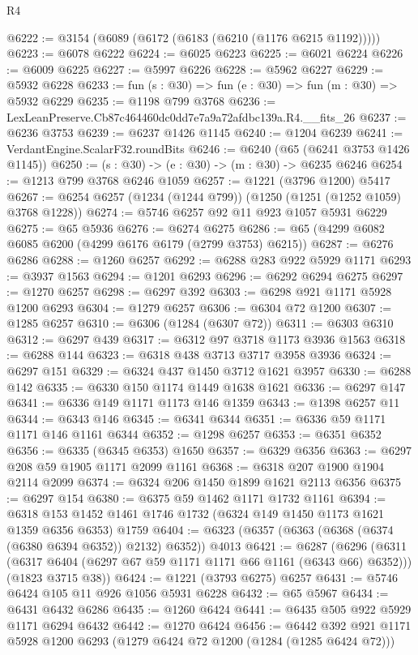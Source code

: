 \begin{lexlean}{R4}
\begin{coremodule}
@6222 := @3154 (@6089 (@6172 (@6183 (@6210 (@1176 @6215 @1192)))))
@6223 := @6078 @6222
@6224 := @6025 @6223
@6225 := @6021 @6224
@6226 := @6009 @6225
@6227 := @5997 @6226
@6228 := @5962 @6227
@6229 := @5932 @6228
@6233 := fun (s : @30) => fun (e : @30) => fun (m : @30) => @5932 @6229
@6235 := @1198 @799 @3768
@6236 := LexLeanPreserve.Cb87c464460dc0dd7e7a9a72afdbc139a.R4.__fits_26
@6237 := @6236 @3753
@6239 := @6237 @1426 @1145
@6240 := @1204 @6239
@6241 := VerdantEngine.ScalarF32.roundBits
@6246 := @6240 (@65 (@6241 @3753 @1426 @1145))
@6250 := (s : @30) -> (e : @30) -> (m : @30) -> @6235 @6246
@6254 := @1213 @799 @3768 @6246 @1059
@6257 := @1221 (@3796 @1200) @5417
@6267 := @6254 @6257 (@1234 (@1244 @799)) (@1250 (@1251 (@1252 @1059) @3768 @1228))
@6274 := @5746 @6257 @92 @11 @923 @1057 @5931 @6229
@6275 := @65 @5936
@6276 := @6274 @6275
@6286 := @65 (@4299 @6082 @6085 @6200 (@4299 @6176 @6179 (@2799 @3753) @6215))
@6287 := @6276 @6286
@6288 := @1260 @6257
@6292 := @6288 @283 @922 @5929 @1171
@6293 := @3937 @1563
@6294 := @1201 @6293
@6296 := @6292 @6294 @6275
@6297 := @1270 @6257
@6298 := @6297 @392
@6303 := @6298 @921 @1171 @5928 @1200 @6293
@6304 := @1279 @6257
@6306 := @6304 @72 @1200
@6307 := @1285 @6257
@6310 := @6306 (@1284 (@6307 @72))
@6311 := @6303 @6310
@6312 := @6297 @439
@6317 := @6312 @97 @3718 @1173 @3936 @1563
@6318 := @6288 @144
@6323 := @6318 @438 @3713 @3717 @3958 @3936
@6324 := @6297 @151
@6329 := @6324 @437 @1450 @3712 @1621 @3957
@6330 := @6288 @142
@6335 := @6330 @150 @1174 @1449 @1638 @1621
@6336 := @6297 @147
@6341 := @6336 @149 @1171 @1173 @146 @1359
@6343 := @1398 @6257 @11
@6344 := @6343 @146
@6345 := @6341 @6344
@6351 := @6336 @59 @1171 @1171 @146 @1161 @6344
@6352 := @1298 @6257
@6353 := @6351 @6352
@6356 := @6335 (@6345 @6353) @1650
@6357 := @6329 @6356
@6363 := @6297 @208 @59 @1905 @1171 @2099 @1161
@6368 := @6318 @207 @1900 @1904 @2114 @2099
@6374 := @6324 @206 @1450 @1899 @1621 @2113 @6356
@6375 := @6297 @154
@6380 := @6375 @59 @1462 @1171 @1732 @1161
@6394 := @6318 @153 @1452 @1461 @1746 @1732 (@6324 @149 @1450 @1173 @1621 @1359 @6356 @6353) @1759
@6404 := @6323 (@6357 (@6363 (@6368 (@6374 (@6380 @6394 @6352)) @2132) @6352)) @4013
@6421 := @6287
    (@6296
      (@6311 (@6317 @6404 (@6297 @67 @59 @1171 @1171 @66 @1161 (@6343 @66) @6352)))
      (@1823 @3715 @38))
@6424 := @1221 (@3793 @6275) @6257
@6431 := @5746 @6424 @105 @11 @926 @1056 @5931 @6228
@6432 := @65 @5967
@6434 := @6431 @6432 @6286
@6435 := @1260 @6424
@6441 := @6435 @505 @922 @5929 @1171 @6294 @6432
@6442 := @1270 @6424
@6456 := @6442 @392 @921 @1171 @5928 @1200 @6293 (@1279 @6424 @72 @1200 (@1284 (@1285 @6424 @72)))

\end{coremodule}
\end{lexlean}
